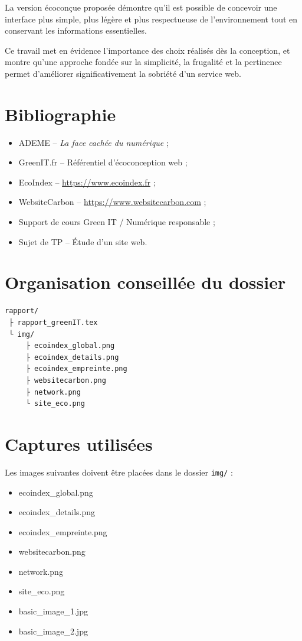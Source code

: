 \documentclass[11pt,a4paper]{article}
\begin{document}
La version écoconçue proposée démontre qu'il est possible de concevoir une interface plus simple, plus légère et plus respectueuse de l'environnement tout en conservant les informations essentielles.

Ce travail met en évidence l'importance des choix réalisés dès la conception, et montre qu'une approche fondée sur la simplicité, la frugalité et la pertinence permet d'améliorer significativement la sobriété d'un service web.

\section{Bibliographie}

\begin{itemize}
\item ADEME -- \textit{La face cachée du numérique} ;
\item GreenIT.fr -- Référentiel d'écoconception web ;
\item EcoIndex -- \url{https://www.ecoindex.fr} ;
\item WebsiteCarbon -- \url{https://www.websitecarbon.com} ;
\item Support de cours Green IT / Numérique responsable ;
\item Sujet de TP -- Étude d'un site web.
\end{itemize}

\appendix

\section{Organisation conseillée du dossier}

\begin{verbatim}
rapport/
 ├ rapport_greenIT.tex
 └ img/
     ├ ecoindex_global.png
     ├ ecoindex_details.png
     ├ ecoindex_empreinte.png
     ├ websitecarbon.png
     ├ network.png
     └ site_eco.png
\end{verbatim}

\section{Captures utilisées}

Les images suivantes doivent être placées dans le dossier \texttt{img/} :

\begin{itemize}
\item ecoindex_global.png
\item ecoindex_details.png
\item ecoindex_empreinte.png
\item websitecarbon.png
\item network.png
\item site_eco.png
\item basic\_image\_1.jpg
\item basic\_image\_2.jpg
\end{itemize}
\end{document}
